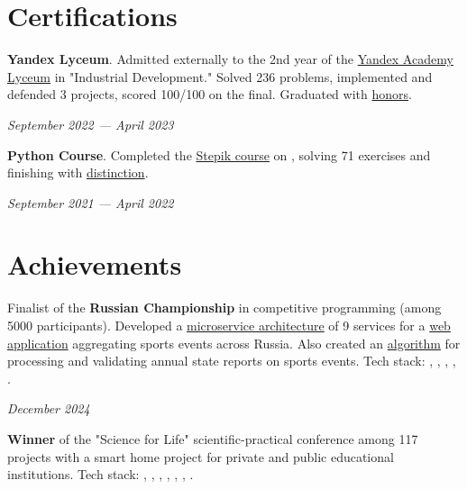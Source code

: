 \documentclass[margin,line]{resume}
\begin{document}
\begin{resume}
  \section{\mysidestyle Certifications}
  \textbf{Yandex Lyceum}. Admitted externally to the 2nd year of the
  \href{https://lyceum.yandex.ru/}{Yandex Academy Lyceum} in
  "Industrial Development." Solved 236 problems, implemented and
  defended 3 projects, scored 100/100 on the final. Graduated with
  \href{https://alchemmist.github.io/CV/attachments/yandex-lyceum.pdf}{honors}.

  \vspace{-6mm}

  \hfill \textsl{September 2022 — April 2023}

  \textbf{Python Course}. Completed the
  \href{https://stepik.org/course/67}{Stepik course} on
  , solving 71 exercises and finishing with
  \href{https://alchemmist.github.io/CV/attachments/stepik-python-course.pdf}{distinction}.

  \vspace{-7mm}

  \hfill \textsl{September 2021 — April 2022}

  \section{\mysidestyle Achievements}
  Finalist of the \textbf{Russian Championship} in competitive
  programming (among 5000 participants). Developed a
  \href{https://alchemmist.github.io/CV/attachments/architect.pdf}{microservice
  architecture} of 9 services for a
  \href{https://github.com/alchemmist/sportprog}{web application}
  aggregating sports events across Russia. Also created an
  \href{https://github.com/alchemmist/sport-afisha/blob/main/event_parsing_service/parse_pdf.py}{algorithm}
  for processing and validating annual state reports on sports
  events. Tech stack: , ,
  , , .

  \vspace{-2mm}

  \hfill \textsl{December 2024}

  \textbf{Winner} of the "Science for Life" scientific-practical
  conference among 117 projects with a smart home project for private
  and public educational institutions. Tech stack:
  , ,
  , , ,
  , .
  \vspace{-6mm}


\end{resume}
\end{document}
